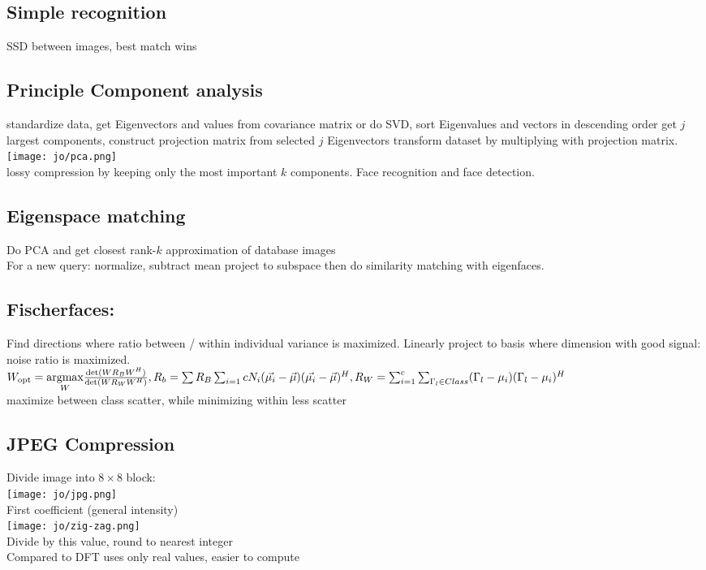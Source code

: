 \subsection*{Simple recognition}
SSD between images, best match wins 
\subsection*{Principle Component analysis }
 standardize data, get Eigenvectors and values from covariance matrix or do SVD, sort Eigenvalues and vectors in descending order get $j$ largest components, construct projection matrix from selected $j$ Eigenvectors transform dataset by multiplying with projection matrix.\\
\texttt{[image: jo/pca.png]}\\
 lossy compression by keeping only the most important $k$ components. Face recognition  and face detection.
\subsection*{Eigenspace matching}
Do PCA  and get closest rank-$k$ approximation of database images  \\
For a new query: normalize, subtract mean  project to subspace then do similarity matching with eigenfaces.
\subsection{Fischerfaces:} 
Find directions where ratio between / within individual variance is maximized. Linearly project to basis where dimension with good signal: noise ratio is maximized. \\
$W_{\text{opt}} = \underset{W}{\text{argmax}} \frac{\det(W R_B W^H)}{\det(W R_W W^H)}, R_b = \sum R_B \sum_{i = 1}{c} N_i (\vec{\mu_i} - \vec{\mu})(\vec{\mu_i} - \vec{\mu})^H, R_W = \sum_{i = 1}^{c} \sum_{\Gamma_l \in Class} (\Gamma_l - \mu_i)(\Gamma_l - \mu_i)^H$\\
 maximize between class scatter, while minimizing within less scatter
\subsection*{JPEG Compression}
Divide image into $8 \times 8$ block:\\
\texttt{[image: jo/jpg.png]}\\
 First coefficient (general intensity)\\
 \texttt{[image: jo/zig-zag.png]}\\
 Divide by this value, round to nearest integer\\
 Compared to DFT uses only real values, easier to compute
